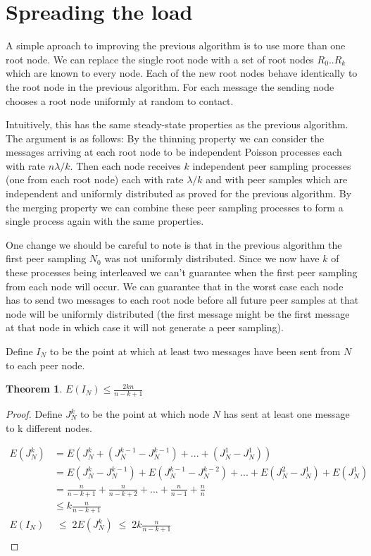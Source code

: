 \documentclass[a4paper,10pt]{article}
\newtheorem*{thm}{Theorem}
\begin{document}
\section{Spreading the load}

A simple aproach to improving the previous algorithm is to use more than one root node. We can replace the single root node with a set of root nodes $R_0 .. R_k$ which are known to every node. Each of the new root nodes behave identically to the root node in the previous algorithm. For each message the sending node chooses a root node uniformly at random to contact. 

Intuitively, this has the same steady-state properties as the previous algorithm. The argument is as follows: By the thinning property we can consider the messages arriving at each root node to be independent Poisson processes each with rate $n \lambda / k$. Then each node receives $k$ independent peer sampling processes (one from each root node) each with rate $\lambda / k$ and with peer samples which are independent and uniformly distributed as proved for the previous algorithm. By the merging property we can combine these peer sampling processes to form a single process again with the same properties. 

One change we should be careful to note is that in the previous algorithm the first peer sampling $N_0$ was not uniformly distributed. Since we now have $k$ of these processes being interleaved we can't guarantee when the first peer sampling from each node will occur. We can guarantee that in the worst case each node has to send two messages to each root node before all future peer samples at that node will be uniformly distributed (the first message might be the first message at that node in which case it will not generate a peer sampling).

Define $I_N$ to be the point at which at least two messages have been sent from $N$ to each peer node.

\begin{thm}$E(I_N) \leq \frac{2kn}{n-k+1}$\end{thm}  

\begin{proof}
Define $J^k_N$ to be the point at which node $N$ has sent at least one message to k different nodes.

\begin{align*}
E(J^k_N) &= E(J^k_N + (J^{k-1}_N - J^{k-1}_N) + ... + (J^1_N - J^1_N)) \\
  &= E(J^k_N - J^{k-1}_N) + E(J^{k-1}_N - J^{k-2}_N) + ... + E(J^2_N - J^1_N) + E(J^1_N) \\
  &= \frac{n}{n-k+1} + \frac{n}{n-k+2} + ... + \frac{n}{n-1} + \frac{n}{n} \\
  &\leq k\frac{n}{n-k+1} \\
E(I_N) & \;\leq\; 2 E(J^k_N) \;\leq\; 2k\frac{n}{n-k+1} \\
\end{align*}
\end{proof}
\end{document}
